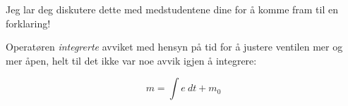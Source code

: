 
Jeg lar deg diskutere dette med medstudentene dine for å komme fram til en forklaring!







Operatøren {\it integrerte} avviket med hensyn på tid for å justere ventilen mer og mer åpen, helt til det ikke var noe avvik igjen å integrere:

$$m = \int e \> dt + m_0$$


